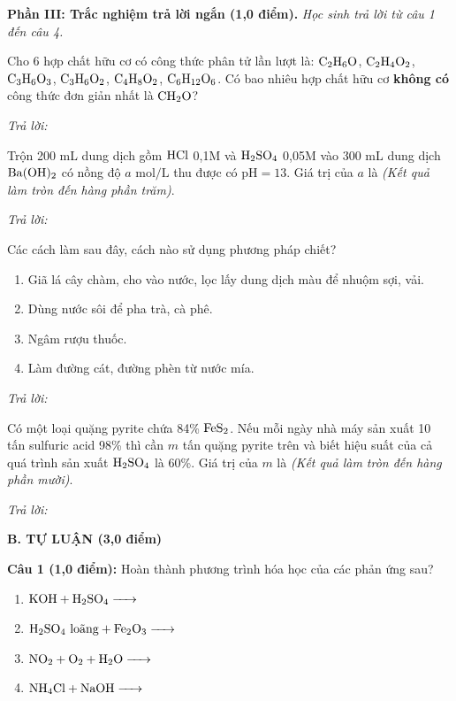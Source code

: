 \documentclass[11pt,a4paper]{article}
\begin{document}
\vspace{6pt}
{\bfseries\color{mainGreen} Phần III: Trắc nghiệm trả lời ngắn (1,0 điểm).}
\textit{Học sinh trả lời từ câu 1 đến câu 4.}
\vspace{4pt}
\begin{ex}
Cho 6 hợp chất hữu cơ có công thức phân tử lần lượt là: $\ce{C2H6O}$, $\ce{C2H4O2}$, $\ce{C3H6O3}$, $\ce{C3H6O2}$, $\ce{C4H8O2}$, $\ce{C6H12O6}$. Có bao nhiêu hợp chất hữu cơ \textbf{không có} công thức đơn giản nhất là $\ce{CH2O}$?
\par\textit{Trả lời:} \dotfill
\loigiai{}
\end{ex}
\begin{ex}
Trộn 200 mL dung dịch gồm $\ce{HCl}$ 0,1M và $\ce{H2SO4}$ 0,05M vào 300 mL dung dịch $\ce{Ba(OH)2}$ có nồng độ $a\text{ mol/L}$ thu được có $\text{pH} = 13$. Giá trị của $a$ là \textit{(Kết quả làm tròn đến hàng phần trăm)}.
\par\textit{Trả lời:} \dotfill
\loigiai{}
\end{ex}
\begin{ex}
Các cách làm sau đây, cách nào sử dụng phương pháp chiết?
\begin{enumerate}[label=(\arabic*),leftmargin=20pt,itemsep=0pt]
\item Giã lá cây chàm, cho vào nước, lọc lấy dung dịch màu để nhuộm sợi, vải.
\item Dùng nước sôi để pha trà, cà phê.
\item Ngâm rượu thuốc.
\item Làm đường cát, đường phèn từ nước mía.
\end{enumerate}
\par\textit{Trả lời:} \dotfill
\loigiai{}
\end{ex}
\begin{ex}
Có một loại quặng pyrite chứa 84\% $\ce{FeS2}$. Nếu mỗi ngày nhà máy sản xuất 10 tấn sulfuric acid 98\% thì cần $m$ tấn quặng pyrite trên và biết hiệu suất của cả quá trình sản xuất $\ce{H2SO4}$ là 60\%. Giá trị của $m$ là \textit{(Kết quả làm tròn đến hàng phần mười)}.
\par\textit{Trả lời:} \dotfill
\loigiai{}
\end{ex}

\vspace{6pt}
{\large\bfseries\color{mainGreen} B. TỰ LUẬN (3,0 điểm)}

\vspace{3pt}
\textbf{Câu 1 (1,0 điểm):} Hoàn thành phương trình hóa học của các phản ứng sau?
\begin{enumerate}[label=\alph*),leftmargin=25pt,itemsep=2pt]
\item $\ce{KOH + H2SO4 ->}$
\item $\ce{H2SO4\text{ loãng} + Fe2O3 ->}$
\item $\ce{NO2 + O2 + H2O ->}$
\item $\ce{NH4Cl + NaOH ->}$
\end{enumerate}
\end{document}
